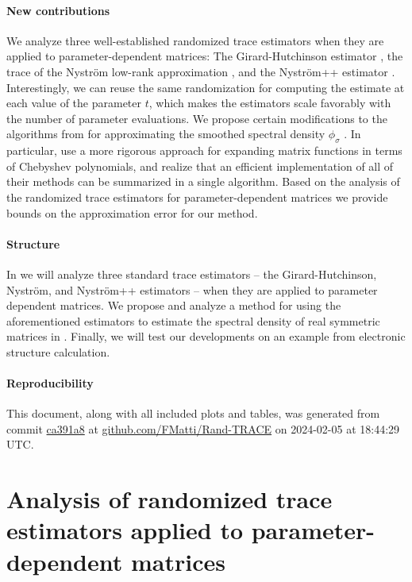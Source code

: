 \documentclass[12pt]{article}
\begin{document}
\paragraph{New contributions} We analyze three well-established randomized trace estimators when they are applied to parameter-dependent matrices: The Girard-Hutchinson estimator \cite{girard-1989-fast-montecarlo, hutchinson-1990-stochastic-estimator}, the trace of the Nyström low-rank approximation \cite{gittens-2013-revisiting-nystrom}, and the Nyström++ estimator \cite{persson-2022-improved-variants}. Interestingly, we can reuse the same randomization for computing the estimate at each value of the parameter $t$, which makes the estimators scale favorably with the number of parameter evaluations. We propose certain modifications to the algorithms from \cite{lin-2017-randomized-estimation} for approximating the smoothed spectral density $\phi_{\sigma}$ . In particular, use a more rigorous approach for expanding matrix functions in terms of Chebyshev polynomials, and realize that an efficient implementation of all of their methods can be summarized in a single algorithm. Based on the analysis of the randomized trace estimators for parameter-dependent matrices we provide bounds on the approximation error for our method.

\paragraph{Structure} In  we will analyze three standard trace estimators -- the Girard-Hutchinson, Nyström, and Nyström++ estimators -- when they are applied to parameter dependent matrices. We propose and analyze a method for using the aforementioned estimators to estimate the spectral density of real symmetric matrices in . Finally, we will test our developments on an example from electronic structure calculation.

\paragraph{Reproducibility} This document, along with all included plots and tables, was generated from commit \href{https://github.com/FMatti/Rand-SD/tree/ca391a8}{ca391a8} at \href{https://github.com/FMatti/Rand-TRACE}{github.com/FMatti/Rand-TRACE} on 2024-02-05 at 18:44:29 UTC.

\section{Analysis of randomized trace estimators applied to parameter-dependent matrices}
\label{sec:analysis}
\end{document}
